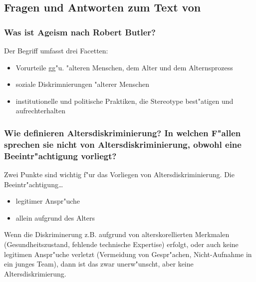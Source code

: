 \subsection{Fragen und Antworten zum Text von \textcite{mayer_altersdiskriminierung_2009}}
\subsubsection{Was ist Ageism nach Robert Butler?}
Der Begriff umfasst drei Facetten:
\begin{itemize}
        \item Vorurteile gg"u. "alteren Menschen, dem Alter und dem Alternsprozess
        \item soziale Diskrimnierungen "alterer Menschen
        \item institutionelle und politische Praktiken, die Stereotype best"atigen und aufrechterhalten
\end{itemize}

\subsubsection{Wie definieren \textcite{mayer_altersdiskriminierung_2009} Altersdiskriminierung? In welchen F"allen sprechen sie nicht von Altersdiskriminierung, obwohl eine Beeintr"achtigung vorliegt?}
Zwei Punkte sind wichtig f"ur das Vorliegen von Altersdiskriminierung. Die Beeintr"achtigung\ldots
\begin{itemize}
        \item legitimer Anspr"uche
        \item allein aufgrund des Alters
\end{itemize}

Wenn die Diskriminerung z.B. aufgrund von alterskorellierten Merkmalen (Gesundheitszustand, fehlende technische Expertise) erfolgt, oder auch keine legitimen Anspr"uche verletzt (Vermeidung von Gespr"achen, Nicht-Aufnahme in ein junges Team), dann ist das zwar unerw"unscht, aber keine Altersdiskrimierung.


